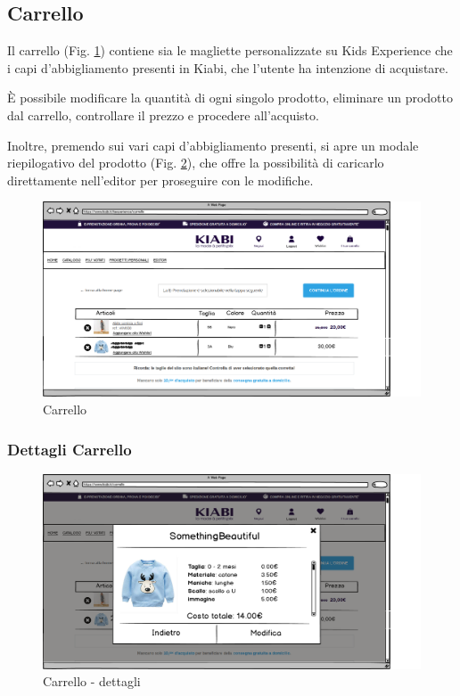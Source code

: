 \documentclass[12pt,italian,]{report}
\begin{document}
\newpage
\subsection{Carrello} 

Il carrello (Fig. \ref{carrello}) contiene sia le magliette personalizzate su Kids Experience che i capi d'abbigliamento presenti in Kiabi, che l'utente ha intenzione di acquistare. 

È possibile modificare la quantità di ogni singolo prodotto, eliminare un prodotto dal carrello, controllare il prezzo e procedere all'acquisto.

Inoltre, premendo sui vari capi d'abbigliamento presenti, si apre un modale riepilogativo del prodotto (Fig. \ref{carrello_dett}), che offre la possibilità di caricarlo direttamente nell'editor per proseguire con le modifiche. 


\begin{figure}[h]
\centering
\includegraphics{../../balsamiq/balsamiq_finale/Carrello.png}
\caption{Carrello}
\label{carrello}
\end{figure}

\newpage
\subsubsection{Dettagli Carrello} 

\begin{figure}[h]
\centering
\includegraphics{../../balsamiq/balsamiq_finale/Carrellodettagli.png}
\caption{Carrello - dettagli}
\label{carrello_dett}
\end{figure}
\end{document}
